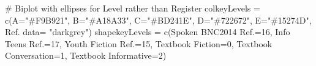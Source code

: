 \documentclass[
  letterpaper,
  DIV=11,
  numbers=noendperiod]{scrreprt}
\newenvironment{Shaded}{\begin{snugshade}}{\end{snugshade}}
\newcommand{\AttributeTok}[1]{\textcolor[rgb]{0.40,0.45,0.13}{#1}}
\newcommand{\CommentTok}[1]{\textcolor[rgb]{0.37,0.37,0.37}{#1}}
\newcommand{\DecValTok}[1]{\textcolor[rgb]{0.68,0.00,0.00}{#1}}
\newcommand{\FunctionTok}[1]{\textcolor[rgb]{0.28,0.35,0.67}{#1}}
\newcommand{\NormalTok}[1]{\textcolor[rgb]{0.00,0.23,0.31}{#1}}
\newcommand{\OtherTok}[1]{\textcolor[rgb]{0.00,0.23,0.31}{#1}}
\newcommand{\StringTok}[1]{\textcolor[rgb]{0.13,0.47,0.30}{#1}}
\begin{document}
\begin{Shaded}
\begin{Highlighting}[]
\CommentTok{\# Biplot with ellipses for Level rather than Register}
\NormalTok{colkeyLevels }\OtherTok{=} \FunctionTok{c}\NormalTok{(}\AttributeTok{A=}\StringTok{"\#F9B921"}\NormalTok{, }\AttributeTok{B=}\StringTok{"\#A18A33"}\NormalTok{, }\AttributeTok{C=}\StringTok{"\#BD241E"}\NormalTok{, }\AttributeTok{D=}\StringTok{"\#722672"}\NormalTok{, }\AttributeTok{E=}\StringTok{"\#15274D"}\NormalTok{, }\StringTok{\textasciigrave{}}\AttributeTok{Ref. data}\StringTok{\textasciigrave{}}\OtherTok{=} \StringTok{"darkgrey"}\NormalTok{)}
\NormalTok{shapekeyLevels }\OtherTok{=} \FunctionTok{c}\NormalTok{(}\StringTok{\textasciigrave{}}\AttributeTok{Spoken BNC2014 Ref.}\StringTok{\textasciigrave{}}\OtherTok{=}\DecValTok{16}\NormalTok{, }\StringTok{\textasciigrave{}}\AttributeTok{Info Teens Ref.}\StringTok{\textasciigrave{}}\OtherTok{=}\DecValTok{17}\NormalTok{, }\StringTok{\textasciigrave{}}\AttributeTok{Youth Fiction Ref.}\StringTok{\textasciigrave{}}\OtherTok{=}\DecValTok{15}\NormalTok{, }\StringTok{\textasciigrave{}}\AttributeTok{Textbook Fiction}\StringTok{\textasciigrave{}}\OtherTok{=}\DecValTok{0}\NormalTok{, }\StringTok{\textasciigrave{}}\AttributeTok{Textbook Conversation}\StringTok{\textasciigrave{}}\OtherTok{=}\DecValTok{1}\NormalTok{, }\StringTok{\textasciigrave{}}\AttributeTok{Textbook Informative}\StringTok{\textasciigrave{}}\OtherTok{=}\DecValTok{2}\NormalTok{)}


\end{Highlighting}
\end{Shaded}
\end{document}
